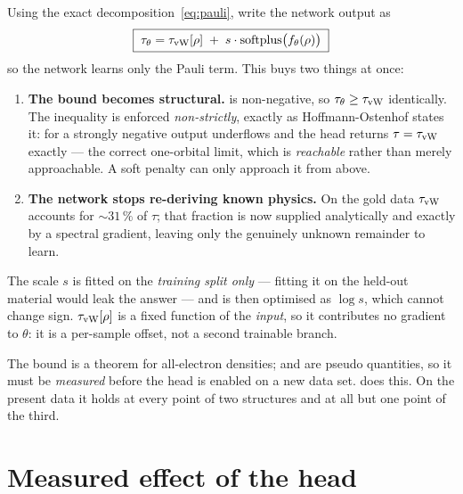 Using the exact decomposition~\eqref{eq:pauli}, write the network output as
\begin{equation}
  \boxed{\;
    \tau_\theta = \tau_{\mathrm{vW}}[\rho] \;+\; s\cdot\mathrm{softplus}\bigl(f_\theta(\rho)\bigr) \;}
  \label{eq:paulihead}
\end{equation}
so the network learns only the Pauli term. This buys two things at once:

\begin{enumerate}
  \item \textbf{The bound becomes structural.}  is non-negative,
    so $\tau_\theta \ge \tau_{\mathrm{vW}}$ identically. The inequality is enforced
    \emph{non-strictly}, exactly as Hoffmann-Ostenhof states it: for a strongly
    negative output  underflows and the head returns
    $\tau=\tau_{\mathrm{vW}}$ exactly --- the correct one-orbital limit, which is
    \emph{reachable} rather than merely approachable. A soft penalty can only
    approach it from above.
  \item \textbf{The network stops re-deriving known physics.} On the gold data
    $\tau_{\mathrm{vW}}$ accounts for $\sim31\,\%$ of $\tau$; that fraction is now supplied
    analytically and exactly by a spectral gradient, leaving only the genuinely
    unknown remainder to learn.
\end{enumerate}

\begin{ptip}
The scale $s$ is fitted on the \emph{training split only} --- fitting it on the
held-out material would leak the answer --- and is then optimised as $\log s$,
which cannot change sign. $\tau_{\mathrm{vW}}[\rho]$ is a fixed function of the
\emph{input}, so it contributes no gradient to $\theta$: it is a per-sample
offset, not a second trainable branch.
\end{ptip}

\begin{pwarn}
The bound is a theorem for all-electron densities;  and
 are pseudo quantities, so it must be \emph{measured} before the
head is enabled on a new data set.  does this.
On the present data it holds at every point of two structures and at all but
one point of the third.
\end{pwarn}

\section{Measured effect of the head}
\label{sec:headresult}

